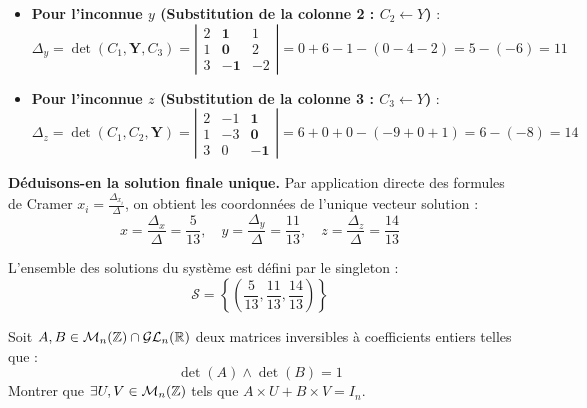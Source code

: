 \documentclass[12pt, a4paper]{report}
\begin{document}
\begin{example}
\begin{itemize}
        \item \textbf{Pour l'inconnue $y$ (Substitution de la colonne 2 : $C_2 \leftarrow Y$)} :
        $$\Delta_y = \det(C_1, \mathbf{Y}, C_3) = \left|\begin{matrix} 2 & \mathbf{1} & 1 \\ 1 & \mathbf{0} & 2 \\ 3 & \mathbf{-1} & -2 \end{matrix}\right| = 0 + 6 - 1 - (0 - 4 - 2) = 5 - (-6) = 11$$
        
        \item \textbf{Pour l'inconnue $z$ (Substitution de la colonne 3 : $C_3 \leftarrow Y$)} :
        $$\Delta_z = \det(C_1, C_2, \mathbf{Y}) = \left|\begin{matrix} 2 & -1 & \mathbf{1} \\ 1 & -3 & \mathbf{0} \\ 3 & 0 & \mathbf{-1} \end{matrix}\right| = 6 + 0 + 0 - (-9 + 0 + 1) = 6 - (-8) = 14$$
    \end{itemize}

    \textbf{Déduisons-en la solution finale unique.} Par application directe des formules de Cramer $x_i = \frac{\Delta_{x_i}}{\Delta}$, on obtient les coordonnées de l'unique vecteur solution :
    $$x = \frac{\Delta_x}{\Delta} = \frac{5}{13}, \quad y = \frac{\Delta_y}{\Delta} = \frac{11}{13}, \quad z = \frac{\Delta_z}{\Delta} = \frac{14}{13}$$
    
    L'ensemble des solutions du système est défini par le singleton :
    $$\mathcal{S} = \left\{\left(\frac{5}{13}, \frac{11}{13}, \frac{14}{13}\right)\right\}$$
\end{example}

\begin{exercise}
    Soit $A,B \in \mathcal{M}_n(\mathbb{Z}) \cap \mathcal{GL}_n(\mathbb{R})$ deux matrices inversibles à coefficients entiers telles que :
    $$\det(A)\wedge \det(B) = 1$$
    Montrer que $\exists U,V \in \mathcal{M}_n(\mathbb{Z})$ tels que $A\times U + B \times V = I_n$.
\end{exercise}
\end{document}
